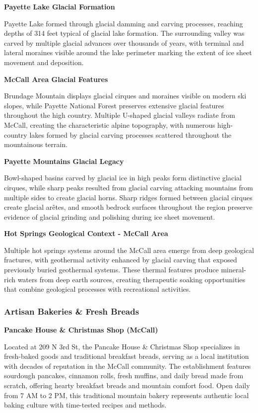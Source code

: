 \documentclass[
  11pt,
  letterpaper,
  DIV=10,
  numbers=noendperiod]{scrartcl}
\begin{document}
\textbf{Payette Lake Glacial Formation}

Payette Lake formed through glacial damming and carving processes,
reaching depths of 314 feet typical of glacial lake formation. The
surrounding valley was carved by multiple glacial advances over
thousands of years, with terminal and lateral moraines visible around
the lake perimeter marking the extent of ice sheet movement and
deposition.

\textbf{McCall Area Glacial Features}

Brundage Mountain displays glacial cirques and moraines visible on
modern ski slopes, while Payette National Forest preserves extensive
glacial features throughout the high country. Multiple U-shaped glacial
valleys radiate from McCall, creating the characteristic alpine
topography, with numerous high-country lakes formed by glacial carving
processes scattered throughout the mountainous terrain.

\textbf{Payette Mountains Glacial Legacy}

Bowl-shaped basins carved by glacial ice in high peaks form distinctive
glacial cirques, while sharp peaks resulted from glacial carving
attacking mountains from multiple sides to create glacial horns. Sharp
ridges formed between glacial cirques create glacial arêtes, and smooth
bedrock surfaces throughout the region preserve evidence of glacial
grinding and polishing during ice sheet movement.

\textbf{Hot Springs Geological Context - McCall Area}

Multiple hot springs systems around the McCall area emerge from deep
geological fractures, with geothermal activity enhanced by glacial
carving that exposed previously buried geothermal systems. These thermal
features produce mineral-rich waters from deep earth sources, creating
therapeutic soaking opportunities that combine geological processes with
recreational activities.

\subsubsection{Artisan Bakeries \& Fresh
Breads}\label{artisan-bakeries-fresh-breads-1}

\textbf{Pancake House \& Christmas Shop (McCall)}

Located at 209 N 3rd St, the Pancake House \& Christmas Shop specializes
in fresh-baked goods and traditional breakfast breads, serving as a
local institution with decades of reputation in the McCall community.
The establishment features sourdough pancakes, cinnamon rolls, fresh
muffins, and daily bread made from scratch, offering hearty breakfast
breads and mountain comfort food. Open daily from 7 AM to 2 PM, this
traditional mountain bakery represents authentic local baking culture
with time-tested recipes and methods.
\end{document}
